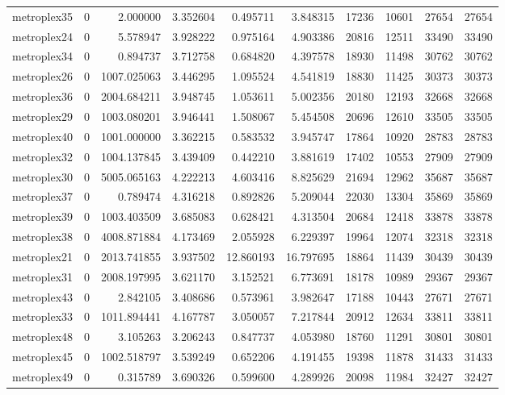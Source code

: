 \begin{longtable}{|l|r|r|r|r|r|r|r|r|r|}
metroplex35 & 0 & 2.000000 & 3.352604 & 0.495711 & 3.848315 & 17236 & 10601 & 27654 & 27654 \\
metroplex24 & 0 & 5.578947 & 3.928222 & 0.975164 & 4.903386 & 20816 & 12511 & 33490 & 33490 \\
metroplex34 & 0 & 0.894737 & 3.712758 & 0.684820 & 4.397578 & 18930 & 11498 & 30762 & 30762 \\
metroplex26 & 0 & 1007.025063 & 3.446295 & 1.095524 & 4.541819 & 18830 & 11425 & 30373 & 30373 \\
metroplex36 & 0 & 2004.684211 & 3.948745 & 1.053611 & 5.002356 & 20180 & 12193 & 32668 & 32668 \\
metroplex29 & 0 & 1003.080201 & 3.946441 & 1.508067 & 5.454508 & 20696 & 12610 & 33505 & 33505 \\
metroplex40 & 0 & 1001.000000 & 3.362215 & 0.583532 & 3.945747 & 17864 & 10920 & 28783 & 28783 \\
metroplex32 & 0 & 1004.137845 & 3.439409 & 0.442210 & 3.881619 & 17402 & 10553 & 27909 & 27909 \\
metroplex30 & 0 & 5005.065163 & 4.222213 & 4.603416 & 8.825629 & 21694 & 12962 & 35687 & 35687 \\
metroplex37 & 0 & 0.789474 & 4.316218 & 0.892826 & 5.209044 & 22030 & 13304 & 35869 & 35869 \\
metroplex39 & 0 & 1003.403509 & 3.685083 & 0.628421 & 4.313504 & 20684 & 12418 & 33878 & 33878 \\
metroplex38 & 0 & 4008.871884 & 4.173469 & 2.055928 & 6.229397 & 19964 & 12074 & 32318 & 32318 \\
metroplex21 & 0 & 2013.741855 & 3.937502 & 12.860193 & 16.797695 & 18864 & 11439 & 30439 & 30439 \\
metroplex31 & 0 & 2008.197995 & 3.621170 & 3.152521 & 6.773691 & 18178 & 10989 & 29367 & 29367 \\
metroplex43 & 0 & 2.842105 & 3.408686 & 0.573961 & 3.982647 & 17188 & 10443 & 27671 & 27671 \\
metroplex33 & 0 & 1011.894441 & 4.167787 & 3.050057 & 7.217844 & 20912 & 12634 & 33811 & 33811 \\
metroplex48 & 0 & 3.105263 & 3.206243 & 0.847737 & 4.053980 & 18760 & 11291 & 30801 & 30801 \\
metroplex45 & 0 & 1002.518797 & 3.539249 & 0.652206 & 4.191455 & 19398 & 11878 & 31433 & 31433 \\
metroplex49 & 0 & 0.315789 & 3.690326 & 0.599600 & 4.289926 & 20098 & 11984 & 32427 & 32427 \\

\end{longtable}
